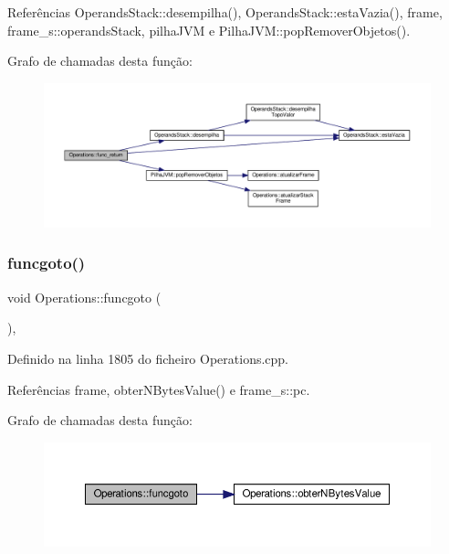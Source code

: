 Referências Operands\+Stack\+::desempilha(), Operands\+Stack\+::esta\+Vazia(), frame, frame\+\_\+s\+::operands\+Stack, pilha\+J\+VM e Pilha\+J\+V\+M\+::pop\+Remover\+Objetos().

Grafo de chamadas desta função\+:
\nopagebreak
\begin{figure}[H]
\begin{center}
\leavevmode
\includegraphics[width=350pt]{classOperations_aa33b77fb62f7e76c347503c97c6b080b_cgraph}
\end{center}
\end{figure}
\mbox{\label{classOperations_a63d1d75decab8e709a6c5da5e59d8188}} 
\subsubsection{\texorpdfstring{funcgoto()}{funcgoto()}}
{\footnotesize\ttfamily void Operations\+::funcgoto (\begin{DoxyParamCaption}{ }\end{DoxyParamCaption})\hspace{0.3cm}{\ttfamily [static]}, {\ttfamily [private]}}



Definido na linha 1805 do ficheiro Operations.\+cpp.



Referências frame, obter\+N\+Bytes\+Value() e frame\+\_\+s\+::pc.

Grafo de chamadas desta função\+:
\nopagebreak
\begin{figure}[H]
\begin{center}
\leavevmode
\includegraphics[width=350pt]{classOperations_a63d1d75decab8e709a6c5da5e59d8188_cgraph}
\end{center}
\end{figure}
\mbox{\label{classOperations_a1880a30623072f8388be782dcf1a390e}} 
